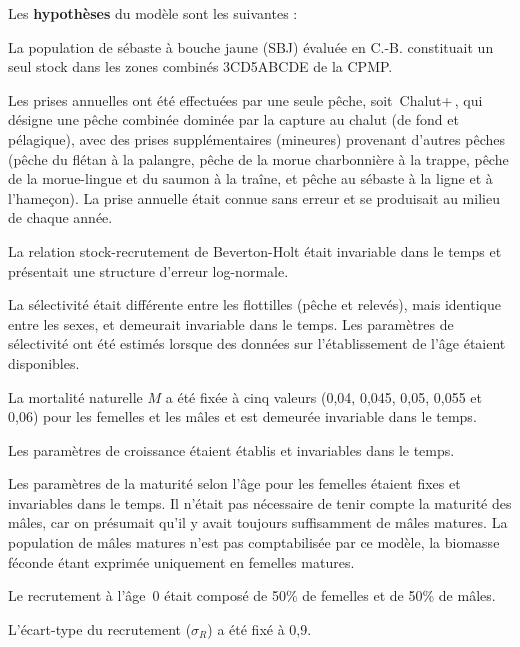 \documentclass[11pt]{book}
\newcommand{\angL}{\guillemotleft\,}
\newcommand{\angR}{\,\guillemotright}
\newcommand{\pc}{\%}
\begin{document}
Les \textbf{ hypoth\`{e}ses} du mod\`{e}le sont les suivantes :
\begin{enumerate_csas}{}{}
\item La population de s\'{e}baste \`{a} bouche jaune (SBJ) \'{e}valu\'{e}e en C.-B. constituait un seul stock dans les zones combin\'{e}s 3CD5ABCDE de la CPMP.
\item Les prises annuelles ont \'{e}t\'{e} effectu\'{e}es par une seule p\^{e}che, soit \angL Chalut+\angR{}, qui d\'{e}signe une p\^{e}che combin\'{e}e domin\'{e}e par la capture au chalut (de fond et p\'{e}lagique), avec des prises suppl\'{e}mentaires (mineures) provenant d'autres p\^{e}ches (p\^{e}che du fl\'{e}tan \`{a} la palangre, p\^{e}che de la morue charbonni\`{e}re \`{a} la trappe, p\^{e}che de la morue-lingue et du saumon \`{a} la tra\^{i}ne, et p\^{e}che au s\'{e}baste \`{a} la ligne et \`{a} l'hame\c{c}on). La prise annuelle \'{e}tait connue sans erreur et se produisait au milieu de chaque ann\'{e}e.
\item La relation stock-recrutement de Beverton-Holt \'{e}tait invariable dans le temps et pr\'{e}sentait une structure d'erreur log-normale.
\item La s\'{e}lectivit\'{e} \'{e}tait diff\'{e}rente entre les flottilles (p\^{e}che et relev\'{e}s), mais identique entre les sexes, et demeurait invariable dans le temps. Les param\`{e}tres de s\'{e}lectivit\'{e} ont \'{e}t\'{e} estim\'{e}s lorsque des donn\'{e}es sur l'\'{e}tablissement de l'\^{a}ge \'{e}taient disponibles.
\item La mortalit\'{e} naturelle $M$ a \'{e}t\'{e} fix\'{e}e \`{a} cinq valeurs (0,04, 0,045, 0,05, 0,055 et 0,06) pour les femelles et les m\^{a}les et est demeur\'{e}e invariable dans le temps.
\item Les param\`{e}tres de croissance \'{e}taient \'{e}tablis et invariables dans le temps.
\item Les param\`{e}tres de la maturit\'{e} selon l'\^{a}ge pour les femelles \'{e}taient fixes et invariables dans le temps. Il n'\'{e}tait pas n\'{e}cessaire de tenir compte la maturit\'{e} des m\^{a}les, car on pr\'{e}sumait qu'il y avait toujours suffisamment de m\^{a}les matures. La population de m\^{a}les matures n'est pas comptabilis\'{e}e par ce mod\`{e}le, la biomasse f\'{e}conde \'{e}tant exprim\'{e}e uniquement en femelles matures.
\item Le recrutement \`{a} l'\^{a}ge~0 \'{e}tait compos\'{e} de 50\pc{} de femelles et de 50\pc{} de m\^{a}les.
\item L'\'{e}cart-type du recrutement ($\sigma_R$) a \'{e}t\'{e} fix\'{e} \`{a} 0,9.

\end{enumerate_csas}
\end{document}
